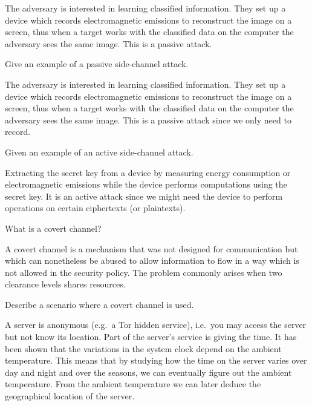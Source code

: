 \begin{solution}
  The adversary is interested in learning classified information.
  They set up a device which records electromagnetic emissions to reconstruct 
  the image on a screen, thus when a target works with the classified data on 
  the computer the adversary sees the same image.
  This is a passive attack.
\end{solution}


\question[3]\label{q:sidechannels}
Give an example of a passive side-channel attack.

\begin{solution}
  The adversary is interested in learning classified information.
  They set up a device which records electromagnetic emissions to reconstruct 
  the image on a screen, thus when a target works with the classified data on 
  the computer the adversary sees the same image.
  This is a passive attack since we only need to record.
\end{solution}


\question[3]\label{q:sidechannels}
Given an example of an active side-channel attack.

\begin{solution}
  Extracting the secret key from a device by measuring energy consumption or 
  electromagnetic emissions while the device performs computations using the 
  secret key.
  It is an active attack since we might need the device to perform operations 
  on certain ciphertexts (or plaintexts).
\end{solution}


\question[3]\label{q:sidechannels}
What is a covert channel?

\begin{solution}
  A covert channel is a mechanism that was not designed for communication but 
  which can nonetheless be abused to allow information to flow in a way which 
  is not allowed in the security policy.
  The problem commonly arises when two clearance levels shares resources.
\end{solution}


\question[4]\label{q:sidechannels}
Describe a scenario where a covert channel is used.

\begin{solution}
  A server is anonymous (e.g.\ a Tor hidden service), i.e.\ you may access the 
  server but not know its location.
  Part of the server's service is giving the time.
  It has been shown that the variations in the system clock depend on the 
  ambient temperature.
  This means that by studying how the time on the server varies over day and 
  night and over the seasons, we can eventually figure out the ambient 
  temperature.
  From the ambient temperature we can later deduce the geographical location of 
  the server.
\end{solution}


